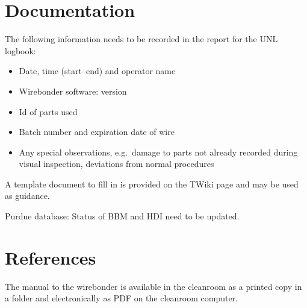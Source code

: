 \documentclass[12pt]{unlsilabsop}
\begin{document}
\section{Documentation}
The following information needs to be recorded in the report for the UNL logbook:
\begin{itemize}
    \item Date, time (start--end) and operator name
    \item Wirebonder software: version
    \item Id of parts used
    \item Batch number and expiration date of wire
    \item Any special observations, e.g.~damage to parts not already recorded during visual inspection, deviations from normal procedures
\end{itemize}
A template document to fill in is provided on the TWiki page and may be used as guidance.

Purdue database: Status of BBM and HDI need to be updated.

\section{References}

The manual to the wirebonder is available in the cleanroom as a printed copy in a folder and electronically as PDF on the cleanroom computer.
\end{document}
